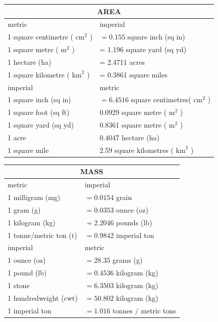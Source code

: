 \documentclass[10pt]{article}
\begin{document}
\begin{center}
\begin{tabular}{|l|l|}
\hline
\multicolumn{2}{|c|}{AREA} \\
\hline
metric & imperial \\
\hline
1 square centimetre ( $\mathrm{cm}^{2}$ ) & $=0.155$ square inch (sq in) \\
\hline
1 square metre ( $\mathrm{m}^{2}$ ) & = 1.196 square yard (sq yd) \\
\hline
1 hectare (ha) & = 2.4711 acres \\
\hline
1 square kilometre ( $\mathrm{km}^{2}$ ) & = 0.3861 square miles \\
\hline
imperial & metric \\
\hline
1 square inch (sq in) & $=6.4516$ square centimetres( $\mathrm{cm}^{2}$ ) \\
\hline
1 square foot (sq ft) & 0.0929 square metre ( $\mathrm{m}^{2}$ ) \\
\hline
1 square yard (sq yd) & 0.8361 square metre ( $\mathrm{m}^{2}$ ) \\
\hline
1 acre & 0.4047 hectare (ha) \\
\hline
1 square mile & 2.59 square kilometres ( $\mathrm{km}^{2}$ ) \\
\hline
\end{tabular}
\end{center}

\begin{center}
\begin{tabular}{|l|l|}
\hline
\multicolumn{2}{|c|}{MASS} \\
\hline
metric & imperial \\
\hline
1 milligram (mg) & $=0.0154$ grain \\
\hline
1 gram (g) & $=0.0353$ ounce (oz) \\
\hline
1 kilogram (kg) & $=2.2046$ pounds (lb) \\
\hline
1 tonne/metric ton (t) & $=0.9842$ imperial ton \\
\hline
imperial & metric \\
\hline
1 ounce (oz) & $=28.35$ grams (g) \\
\hline
1 pound (lb) & $=0.4536$ kilogram (kg) \\
\hline
1 stone & $=6.3503$ kilogram (kg) \\
\hline
1 hundredweight (cwt) & $=50.802$ kilogram (kg) \\
\hline
1 imperial ton & $=1.016$ tonnes $/$ metric tons \\
\hline
\end{tabular}
\end{center}
\end{document}
